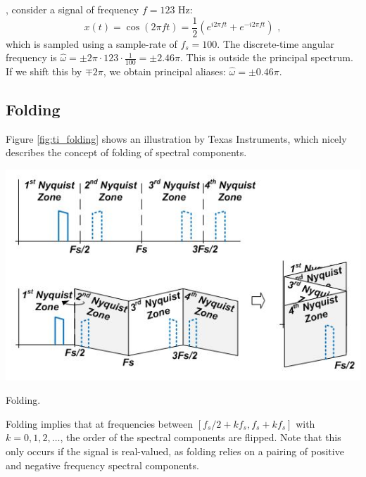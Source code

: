 , consider a signal of frequency $f=123$ Hz:
\begin{equation}
  x(t) =\cos( 2\pi f t) = \frac{1}{2}(e^{i 2\pi f t}+e^{-i 2\pi f t})\,\,,
\end{equation}
which is sampled using a sample-rate of $f_s=100$. The discrete-time angular frequency is 
$\hat{\omega} = \pm 2\pi \cdot 123 \cdot\frac{1}{100} = \pm 2.46\pi$. 
This is outside the principal spectrum. If we shift this by $\mp 2\pi$, we obtain principal aliases:
$\hat{\omega} = \pm 0.46 \pi$.

\subsection{Folding}
Figure \ref{fig:ti_folding} shows an illustration by Texas Instruments, 
which nicely describes the concept of folding of spectral components.

\begin{marginfigure}[-4cm]
  \begin{center}
    \includegraphics[width=\textwidth]{ch09/figures/folding.JPG}
  \end{center}
  \caption{Folding.}
  \label{fig:ti_folding}
\end{marginfigure}

Folding implies that at frequencies between $[f_s/2+k f_s,f_s + kf_s]$ with $k=0,1,2,\ldots$, 
the order of the spectral components are flipped. Note that this only occurs if the signal is real-valued,
as folding relies on a pairing of positive and negative frequency spectral components.

